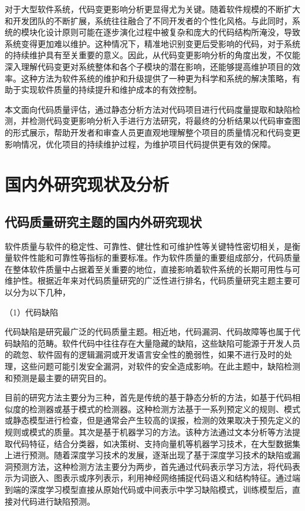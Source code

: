 对于大型软件系统，代码变更影响分析更显得尤为关键。随着软件规模的不断扩大和开发团队的不断扩展，系统往往融合了不同开发者的个性化风格。与此同时，系统的模块化设计原则可能在逐步演化过程中被复杂和庞大的代码结构所淹没，导致系统变得更加难以维护。这种情况下，精准地识别变更后受影响的代码，对于系统的持续维护具有至关重要的意义。因此，从代码变更影响分析的角度出发，不仅能深入理解代码变更对系统整体和各个子模块的潜在影响，还能够提高维护项目的效率\cite{2022An}。这种方法为软件系统的维护和升级提供了一种更为科学和系统的解决策略，有助于实现软件质量的持续提升和维护成本的有效控制。

本文面向代码质量评估，通过静态分析方法对代码项目进行代码度量提取和缺陷检测，并检测代码变更影响分析入手进行方法研究，将最终的分析结果以代码审查图的形式展示，帮助开发者和审查人员更直观地理解整个项目的质量情况和代码变更影响情况，优化项目的持续维护过程，为维护项目代码提供更有效的保障。

\section{国内外研究现状及分析}


\subsection{代码质量研究主题的国内外研究现状}

软件质量与软件的稳定性、可靠性、健壮性和可维护性等关键特性密切相关，是衡量软件性能和可靠性等指标的重要标准。作为软件质量的重要组成部分，代码质量在整体软件质量中占据着至关重要的地位，直接影响着软件系统的长期可用性与可维护性。根据近年来对代码质量研究的广泛性进行排名\cite{NUNEZVARELA2017164}，代码质量研究主题主要可以分为以下几种，

（1）代码缺陷

代码缺陷是研究最广泛的代码质量主题。相近地，代码漏洞、代码故障等也属于代码缺陷的范畴。软件代码中往往存在大量隐藏的缺陷，这些缺陷可能源于开发人员的疏忽、软件固有的逻辑漏洞或开发语言安全性的脆弱性，如果不进行及时的处理，这些问题可能引发安全漏洞，对软件的安全造成影响。在此主题中，缺陷检测和预测是最主要的研究目的。

目前的研究方法主要分为三种，首先是传统的基于静态分析的方法，如基于代码相似度的检测器\cite{Sheneamer2018A,2014A}或基于模式的检测器\cite{2012Mitigating,2017IDE,2016How}。这种检测方法基于一系列预定义的规则、模式或静态模型进行检查，但是通常会产生较高的误报，检测的效果取决于预先定义的规则或模式的质量。其次是基于机器学习的方法。该种方法通过文本分析等方法提取代码特征，结合分类器，如决策树、支持向量机等机器学习技术\cite{2017Assessment,2018A,2020The}，在大型数据集上进行预测。随着深度学习技术的发展，逐渐出现了基于深度学习技术的缺陷或漏洞预测方法，这种检测方法主要分为两步，首先通过代码表示学习方法，将代码表示为词嵌入、图表示或序列表示，利用神经网络捕捉代码语义和结构特征。通过端到端的深度学习模型直接从原始代码或中间表示中学习缺陷模式，训练模型后，直接对代码进行缺陷预测。


